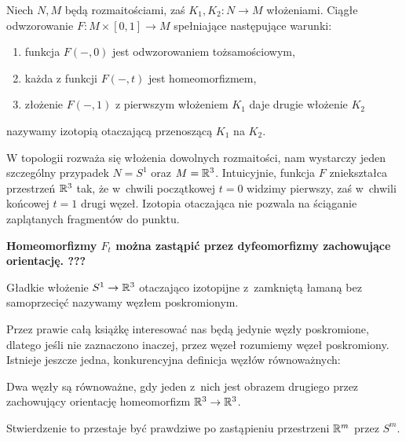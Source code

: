 \begin{definition} \label{def_ambient_isotopy}
    Niech $N, M$ będą rozmaitościami, zaś $K_1, K_2 \colon N \to M$ włożeniami.
    Ciągłe odwzorowanie $F \colon M \times [0,1] \to M$ spełniające następujące warunki:
    \begin{enumerate}
        \item funkcja $F(-, 0)$ jest odwzorowaniem tożsamościowym,
        \item każda z funkcji $F(-, t)$ jest homeomorfizmem,
        \item złożenie $F(-, 1)$ z pierwszym włożeniem $K_1$ daje drugie włożenie $K_2$
    \end{enumerate}
    nazywamy izotopią otaczającą przenoszącą $K_1$ na $K_2$.
\end{definition}

W topologii rozważa się włożenia dowolnych rozmaitości, nam wystarczy jeden szczególny przypadek $N = S^1$ oraz $M = \mathbb R^3$.
Intuicyjnie, funkcja $F$ zniekształca przestrzeń $\mathbb R^3$ tak, że w~chwili początkowej $t = 0$ widzimy pierwszy, zaś w~chwili końcowej $t = 1$ drugi węzeł.
Izotopia otaczająca nie pozwala na ściąganie zaplątanych fragmentów do punktu.

{\color{red}\textbf{Homeomorfizmy $F_t$ można zastąpić przez dyfeomorfizmy zachowujące orientację. ???}}

\begin{definition}[węzeł]
    \label{def:knot}
    Gładkie włożenie $S^1 \to \mathbb R^3$ otaczająco izotopijne z~zamkniętą łamaną bez samoprzecięć nazywamy węzłem poskromionym.
\end{definition}

Przez prawie całą książkę interesować nas będą jedynie węzły poskromione,
dlatego jeśli nie zaznaczono inaczej, przez węzeł rozumiemy węzeł poskromiony.
Istnieje jeszcze jedna, konkurencyjna definicja węzłów równoważnych:

\begin{proposition}
    \label{equivalent_knots_2}
    Dwa węzły są równoważne, gdy jeden z~nich jest obrazem drugiego przez zachowujący orientację homeomorfizm $\mathbb R^3 \to \mathbb R^3$.
\end{proposition}

Stwierdzenie to przestaje być prawdziwe po zastąpieniu przestrzeni $\mathbb R^m$ przez $S^m$.

